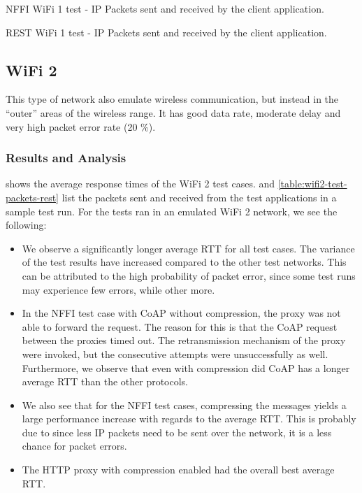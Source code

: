 \begin{table}[h]

\caption{NFFI WiFi 1 test - IP Packets sent and received by the client application.}
\label{table:wifi1-test-packets-nffi}
\end{table}

\begin{table}[h]

\caption{REST WiFi 1 test - IP Packets sent and received by the client application.}
\label{table:wifi1-test-packets-rest}
\end{table}


\subsection{WiFi 2}

This type of network also emulate wireless communication, but instead in the
``outer'' areas of the wireless range. It has good data rate, moderate delay
and very high packet error rate (20 \%).


\subsubsection{Results and Analysis}

 shows the average response times of the WiFi 2 test
cases.  and
\cref{table:wifi2-test-packets-rest} list the packets sent and received from the
test applications in a sample test run. For the tests ran in an emulated WiFi 2
network, we see the following:

\begin{itemize}

    \item We observe a significantly longer average RTT for all test cases. The
    variance of the test results have increased compared to the other test
    networks. This can be attributed to the high probability of packet error,
    since some test runs may experience few errors, while other more.

    \item In the NFFI test case with CoAP without compression, the proxy was not
    able to forward the request. The reason for this is that the CoAP request
    between the proxies timed out. The retransmission mechanism of the proxy
    were invoked, but the consecutive attempts were unsuccessfully as well.
    Furthermore, we observe that even with compression did CoAP has a longer
    average RTT than the other protocols.

    \item We also see that for the NFFI test cases, compressing the messages
    yields a large performance increase with regards to the average RTT. This is
    probably due to since less IP packets need to be sent over the network, it
    is a less chance for packet errors.

    \item The HTTP proxy with compression enabled had the overall best average
    RTT.

\end{itemize}


